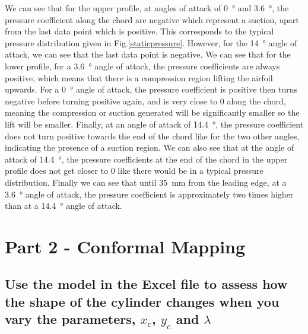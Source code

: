 \documentclass[11pt]{article}
\numberwithin{equation}{section}
\begin{document}
We can see that for the upper profile, at angles of attack of \SI{0}{\degree} and \SI{3.6}{\degree}, the pressure coefficient along the chord are negative which represent a suction, apart from the last data point which is positive. This corresponds to the typical pressure distribution given in Fig.\ref{staticpressure}. However, for the \SI{14}{\degree} angle of attack, we can see that the last data point is negative. We can see that for the lower profile, for a \SI{3.6}{\degree} angle of attack, the pressure coefficients are always positive, which means that there is a compression region lifting the airfoil upwards. For a \SI{0}{\degree} angle of attack, the pressure coefficient is positive then turns negative before turning positive again, and is very close to 0 along the chord, meaning the compression or suction generated will be significantly smaller so the lift will be smaller. Finally, at an angle of attack of \SI{14.4}{\degree}, the pressure coefficient does not turn positive towards the end of the chord like for the two other angles, indicating the presence of a suction region. We can also see that at the angle of attack of \SI{14.4}{\degree}, the pressure coefficients at the end of the chord in the upper profile does not get closer to 0 like there would be in a typical pressure distribution. Finally we can see that until \SI{35}{\milli\meter} from the leading edge, at a \SI{3.6}{\degree} angle of attack, the pressure coefficient is approximately two times higher than at a \SI{14.4}{\degree} angle of attack.
\section*{Part 2 - Conformal Mapping}
\subsection*{Use the model in the Excel file to assess how the shape of the cylinder changes when you vary the parameters, $x_c$, $y_c$ and $\lambda$}
\end{document}
